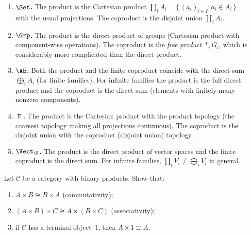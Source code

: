 \begin{example}%
\label{ex:products-concrete}
\begin{enumerate}[label=(\roman*)]
\item \textbf{$\Set$.} The product is the Cartesian product
    $\prod_{i} A_i = \{\,(a_i)_{i\in I} : a_i\in A_i\,\}$
    with the usual projections.
    The coproduct is the disjoint union $\coprod_{i} A_i$.

\item \textbf{$\Grp$.} The product is the direct product of groups
    (Cartesian product with component-wise operations).
    The coproduct is the \emph{free product} $\ast_{i} G_i$,
    which is considerably more complicated than the direct product.

\item \textbf{$\Ab$.} Both the product and the finite coproduct
    coincide with the direct sum $\bigoplus_{i} A_i$
    (for finite families).  For infinite families the product
    is the full direct product and the coproduct is the direct sum
    (elements with finitely many nonzero components).

\item \textbf{$\Top$.} The product is the Cartesian product with the
    product topology (the coarsest topology making all projections
    continuous).  The coproduct is the disjoint union with the
    coproduct (disjoint union) topology.

\item \textbf{$\Vect_\K$.} The product is the direct product
    of vector spaces and the finite coproduct is the direct sum.
    For infinite families, $\prod_i V_i \neq \bigoplus_i V_i$
    in general.
\end{enumerate}
\end{example}

\begin{exercise}\label{exer:product-comm-assoc}
Let $\mathcal{C}$ be a category with binary products.
Show that:
\begin{enumerate}[label=(\alph*)]
\item $A \times B \cong B \times A$ (commutativity);
\item $(A \times B) \times C \cong A \times (B \times C)$ (associativity);
\item if $\mathcal{C}$ has a terminal object~$1$, then $A \times 1 \cong A$.
\end{enumerate}
\end{exercise}


